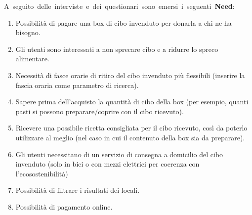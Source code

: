 \documentclass{article}
\begin{document}
\hbox{A seguito delle interviste e dei questionari sono emersi i seguenti \textbf{Need}:}
\begin{enumerate}[label=\textbf{Need-\arabic*}]
    \item Possibilità di pagare una box di cibo invenduto per donarla a chi ne ha bisogno. \label{need1}
    \item Gli utenti sono interessati a non sprecare cibo e a ridurre lo spreco alimentare. \label{need2}
    \item Necessità di fasce orarie di ritiro del cibo invenduto più flessibili (inserire la fascia oraria come parametro di ricerca). \label{need3}
    \item Sapere prima dell'acquisto la quantità di cibo della box (per esempio, quanti pasti si possono preparare/coprire con il cibo ricevuto). \label{need4}
    \item Ricevere una possibile ricetta consigliata per il cibo ricevuto, così da poterlo utilizzare al meglio (nel caso in cui il contenuto della box sia da preparare). \label{need5}
    \item Gli utenti necessitano di un servizio di consegna a domicilio del cibo invenduto (solo in bici o con mezzi elettrici per coerenza con l'ecosostenibilità) \label{need6}
    \item Possibilità di filtrare i risultati dei locali. \label{need7}
    \item Possibilità di pagamento online. \label{need8}
\end{enumerate}
\end{document}
